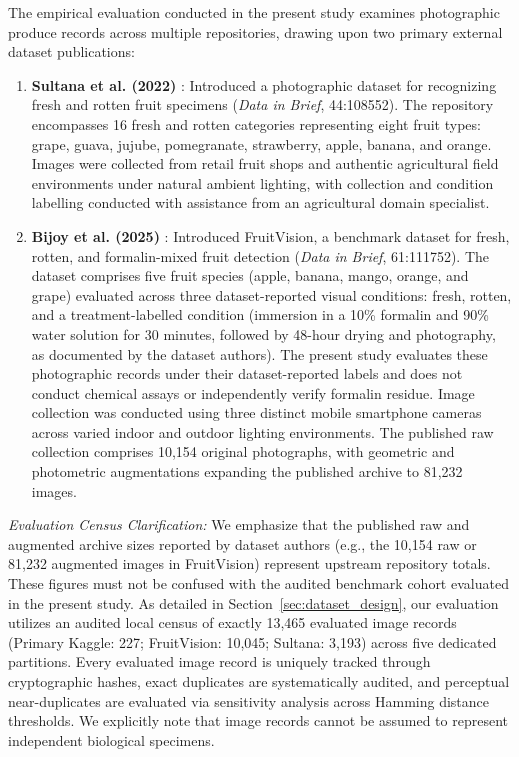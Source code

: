 The empirical evaluation conducted in the present study examines photographic produce records across multiple repositories, drawing upon two primary external dataset publications:
\begin{enumerate}
\item \textbf{Sultana et al. (2022)} \cite{sultana2022extensive}: Introduced a photographic dataset for recognizing fresh and rotten fruit specimens (\textit{Data in Brief}, 44:108552). The repository encompasses 16 fresh and rotten categories representing eight fruit types: grape, guava, jujube, pomegranate, strawberry, apple, banana, and orange. Images were collected from retail fruit shops and authentic agricultural field environments under natural ambient lighting, with collection and condition labelling conducted with assistance from an agricultural domain specialist.
\item \textbf{Bijoy et al. (2025)} \cite{bijoy2025fruitvision}: Introduced FruitVision, a benchmark dataset for fresh, rotten, and formalin-mixed fruit detection (\textit{Data in Brief}, 61:111752). The dataset comprises five fruit species (apple, banana, mango, orange, and grape) evaluated across three dataset-reported visual conditions: fresh, rotten, and a treatment-labelled condition (immersion in a 10\% formalin and 90\% water solution for 30 minutes, followed by 48-hour drying and photography, as documented by the dataset authors). The present study evaluates these photographic records under their dataset-reported labels and does not conduct chemical assays or independently verify formalin residue. Image collection was conducted using three distinct mobile smartphone cameras across varied indoor and outdoor lighting environments. The published raw collection comprises 10,154 original photographs, with geometric and photometric augmentations expanding the published archive to 81,232 images.
\end{enumerate}

\noindent \textit{Evaluation Census Clarification:} We emphasize that the published raw and augmented archive sizes reported by dataset authors (e.g., the 10,154 raw or 81,232 augmented images in FruitVision) represent upstream repository totals. These figures must not be confused with the audited benchmark cohort evaluated in the present study. As detailed in Section~\ref{sec:dataset_design}, our evaluation utilizes an audited local census of exactly 13,465 evaluated image records (Primary Kaggle: 227; FruitVision: 10,045; Sultana: 3,193) across five dedicated partitions. Every evaluated image record is uniquely tracked through cryptographic hashes, exact duplicates are systematically audited, and perceptual near-duplicates are evaluated via sensitivity analysis across Hamming distance thresholds. We explicitly note that image records cannot be assumed to represent independent biological specimens.

